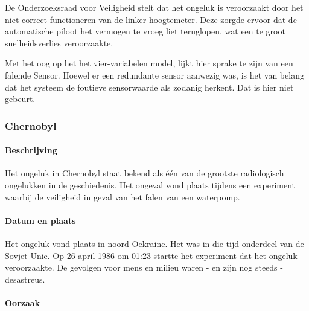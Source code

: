 \documentclass{article}
\begin{document}
\begin{itemize}
			De Onderzoeksraad voor Veiligheid stelt dat het ongeluk is veroorzaakt door het niet-correct functioneren van de linker hoogtemeter. Deze zorgde ervoor dat de automatische piloot het vermogen te vroeg liet teruglopen, wat een te groot snelheidsverlies veroorzaakte.

			Met het oog op het het vier-variabelen model, lijkt hier sprake te zijn van een falende Sensor. Hoewel er een redundante sensor aanwezig was, is het van belang dat het systeem de foutieve sensorwaarde als zodanig herkent. Dat is hier niet gebeurt.

				\end{itemize}
			
			\subsubsection{Chernobyl}

				\paragraph{Beschrijving}

					Het ongeluk in Chernobyl staat bekend als één van de grootste radiologisch ongelukken in de geschiedenis. Het ongeval vond plaats tijdens een experiment waarbij de veiligheid in geval van het falen van een waterpomp. \cite{ragheb2010chernobyl} \par

				\paragraph{Datum en plaats}

					Het ongeluk vond plaats in noord Oekraine. Het was in die tijd onderdeel van de Sovjet-Unie. Op 26 april 1986 om 01:23 startte het experiment dat het ongeluk veroorzaakte. De gevolgen voor mens en milieu waren - en zijn nog steeds - desastreus. \cite{BERESFORD201677} \par

				\paragraph{Oorzaak}
\end{document}
